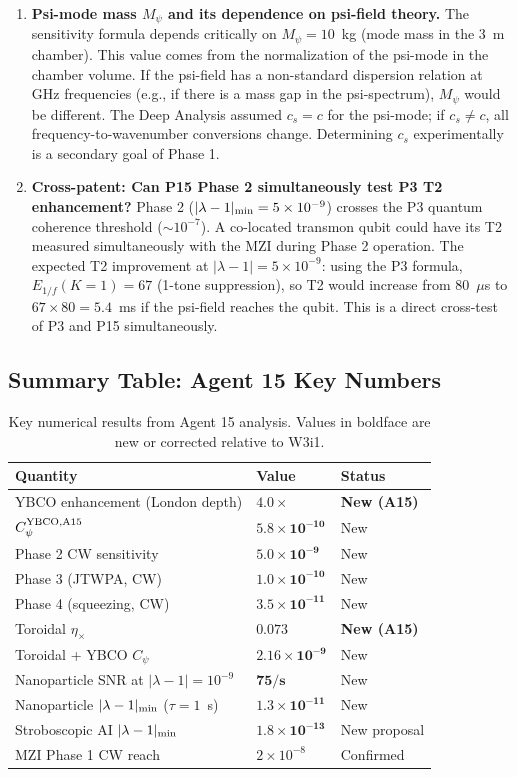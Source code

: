 \documentclass[11pt]{article}
\newcommand{\ee}[1]{\times 10^{#1}}
\begin{document}
\begin{enumerate}
\item \textbf{Psi-mode mass $M_\psi$ and its dependence on psi-field theory.}
The sensitivity formula depends critically on $M_\psi = 10$~kg (mode mass
in the 3~m chamber). This value comes from the normalization of the psi-mode
in the chamber volume. If the psi-field has a non-standard dispersion relation
at GHz frequencies (e.g., if there is a mass gap in the psi-spectrum), $M_\psi$
would be different. The Deep Analysis assumed $c_s = c$ for the psi-mode;
if $c_s \neq c$, all frequency-to-wavenumber conversions change.
Determining $c_s$ experimentally is a secondary goal of Phase 1.

\item \textbf{Cross-patent: Can P15 Phase 2 simultaneously test P3 T2 enhancement?}
Phase 2 ($|\lambda-1|_{\rm min} = 5\ee{-9}$) crosses the P3 quantum coherence
threshold ($\sim 10^{-7}$). A co-located transmon qubit could have its T2
measured simultaneously with the MZI during Phase 2 operation.
The expected T2 improvement at $|\lambda-1| = 5\ee{-9}$: using the P3 formula,
$E_{1/f}(K=1) = 67$ (1-tone suppression), so T2 would increase from 80~$\mu$s
to $67 \times 80 = 5.4$~ms if the psi-field reaches the qubit.
This is a direct cross-test of P3 and P15 simultaneously.

\end{enumerate}

\subsection*{Summary Table: Agent 15 Key Numbers}

\begin{table}[h]
\centering
\caption{Key numerical results from Agent 15 analysis. Values in boldface
are new or corrected relative to W3i1.}
\begin{tabular}{p{}p{}p{}}
\toprule
Quantity & Value & Status \\
\midrule
YBCO enhancement (London depth) & $\mathbf{4.0\times}$ & \textbf{New (A15)} \\
$C_\psi^{\rm YBCO,A15}$ & $\mathbf{5.8\ee{-10}}$ & New \\
Phase 2 CW sensitivity & $\mathbf{5.0\ee{-9}}$ & New \\
Phase 3 (JTWPA, CW) & $\mathbf{1.0\ee{-10}}$ & New \\
Phase 4 (squeezing, CW) & $\mathbf{3.5\ee{-11}}$ & New \\
Toroidal $\eta_\times$ & $\mathbf{0.073}$ & \textbf{New (A15)} \\
Toroidal + YBCO $C_\psi$ & $\mathbf{2.16\ee{-9}}$ & New \\
Nanoparticle SNR at $|\lambda-1| = 10^{-9}$ & $\mathbf{75/\text{s}}$ & New \\
Nanoparticle $|\lambda-1|_{\rm min}$ ($\tau=1$~s) & $\mathbf{1.3\ee{-11}}$ & New \\
Stroboscopic AI $|\lambda-1|_{\rm min}$ & $\mathbf{1.8\ee{-13}}$ & New proposal \\
MZI Phase 1 CW reach & $2\ee{-8}$ & Confirmed \\
\bottomrule
\end{tabular}
\end{table}
\end{document}
